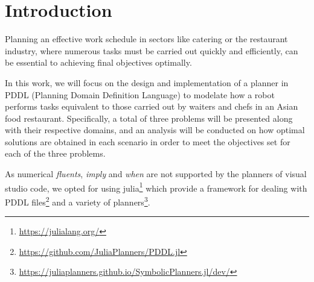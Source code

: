\section{Introduction}

Planning an effective work schedule in sectors like catering or the restaurant industry, where numerous tasks must be carried out quickly and efficiently, can be essential to achieving final objectives optimally.

In this work, we will focus on the design and implementation of a planner in PDDL (Planning Domain Definition Language) to modelate how a robot performs tasks equivalent to those carried out by waiters and chefs in an Asian food restaurant. Specifically, a total of three problems will be presented along with their respective domains, and an analysis will be conducted on how optimal solutions are obtained in each scenario in order to meet the objectives set for each of the three problems.

As numerical \textit{fluents}, \textit{imply} and \textit{when} are not supported by the planners of visual studio code, we opted for using julia\footnote{\url{https://julialang.org/}} which provide a framework for dealing with PDDL files\footnote{\url{https://github.com/JuliaPlanners/PDDL.jl}} and a variety of planners\footnote{\url{https://juliaplanners.github.io/SymbolicPlanners.jl/dev/}}.

